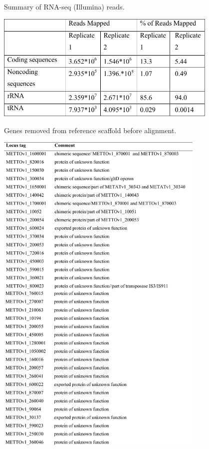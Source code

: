 \begin{table}[H]
\caption[Summary of RNA-seq (Illumina) reads]{Summary of RNA-seq (Illumina) reads.}
\label{table:ChA_S4}
\includegraphics[width=0.8\textwidth]{./tex/chapter1/figures/supplemental/TableS4.pdf}
\end{table}

\begin{table}[H]
\caption[Genes removed from reference scaffold before alignment]
	{Genes removed from reference scaffold before alignment.}
\label{table:ChA_S5}
\includegraphics[width=0.75\textwidth]{./tex/chapter1/figures/supplemental/TableS5.pdf}
\end{table}


